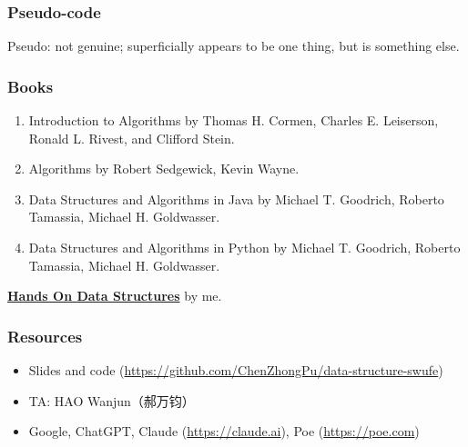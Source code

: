\documentclass[aspectratio=169, 14pt]{beamer}
\begin{document}
\begin{frame}[fragile]
	\frametitle{Pseudo-code}
	Pseudo: not genuine; superficially appears to be one thing, but is something else.

\end{frame}

\begin{frame}
	\frametitle{Books}
	\begin{enumerate}
		\item \alert{Introduction to Algorithms} by Thomas H. Cormen, Charles E. Leiserson, Ronald L. Rivest, and Clifford Stein.
		\item \alert{Algorithms} by Robert Sedgewick, Kevin Wayne.
		\item \alert{Data Structures and Algorithms in Java} by Michael T. Goodrich, Roberto Tamassia, Michael H. Goldwasser.
		\item \alert{Data Structures and Algorithms in Python} by Michael T. Goodrich, Roberto Tamassia, Michael H. Goldwasser.
	\end{enumerate}
	\textbf{\href{https://chenzhongpu.github.io/data-structure-swufe/}{Hands On Data Structures}} by me.
\end{frame}

\begin{frame}
	\frametitle{Resources}
	\begin{itemize}
		\item Slides and code (\url{https://github.com/ChenZhongPu/data-structure-swufe})
		\item TA: HAO Wanjun（郝万钧）
		\item Google, ChatGPT, Claude (\url{https://claude.ai}), Poe (\url{https://poe.com})
	\end{itemize}
\end{frame}
\end{document}
